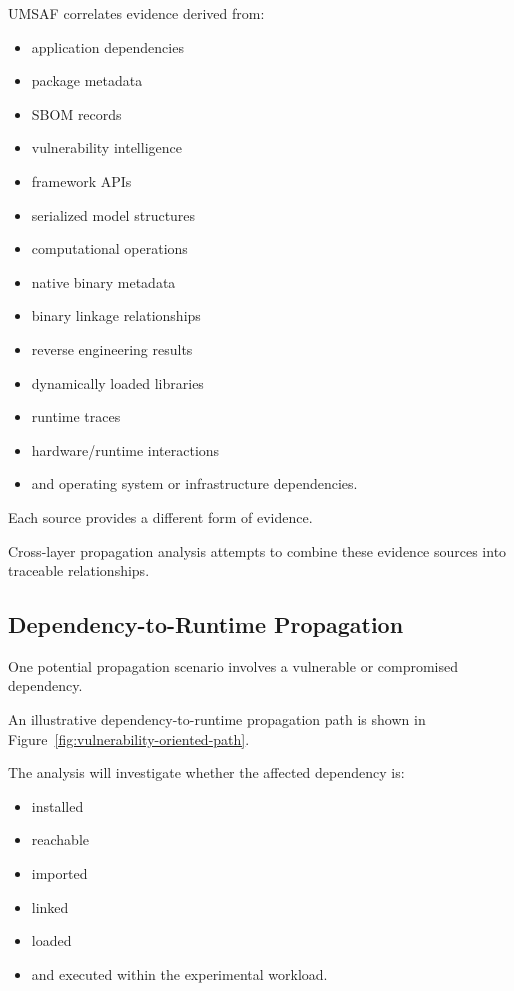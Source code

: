 \documentclass[
  12pt,
  letterpaper,
  oneside]{report}
\providecommand{\tightlist}{%
  \setlength{\itemsep}{0pt}\setlength{\parskip}{0pt}}
\begin{document}
UMSAF correlates evidence derived from:

\begin{itemize}
\tightlist
\item
  application dependencies
\item
  package metadata
\item
  SBOM records
\item
  vulnerability intelligence
\item
  framework APIs
\item
  serialized model structures
\item
  computational operations
\item
  native binary metadata
\item
  binary linkage relationships
\item
  reverse engineering results
\item
  dynamically loaded libraries
\item
  runtime traces
\item
  hardware/runtime interactions
\item
  and operating system or infrastructure dependencies.
\end{itemize}

Each source provides a different form of evidence.

Cross-layer propagation analysis attempts to combine these evidence
sources into traceable relationships.

\subsection{Dependency-to-Runtime Propagation}\label{11122-dependency-to-runtime-propagation}

One potential propagation scenario involves a vulnerable or compromised
dependency.

An illustrative dependency-to-runtime propagation path is shown in
Figure~\ref{fig:vulnerability-oriented-path}.

The analysis will investigate whether the affected dependency is:

\begin{itemize}
\tightlist
\item
  installed
\item
  reachable
\item
  imported
\item
  linked
\item
  loaded
\item
  and executed within the experimental workload.
\end{itemize}
\end{document}
